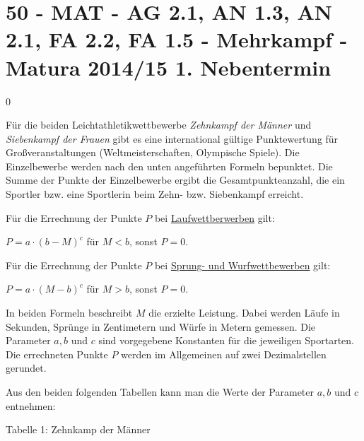 \section{50 - MAT - AG 2.1, AN 1.3, AN 2.1, FA 2.2, FA 1.5 - Mehrkampf - Matura 2014/15 1. Nebentermin}

\begin{langesbeispiel} \item[0] %
				
				Für die beiden Leichtathletikwettbewerbe \textit{Zehnkampf der Männer} und \textit{Siebenkampf der Frauen} gibt es eine international gültige Punktewertung für Großveranstaltungen (Weltmeisterschaften, Olympische Spiele). Die Einzelbewerbe werden nach den unten angeführten Formeln bepunktet. Die Summe der Punkte der Einzelbewerbe ergibt die Gesamtpunkteanzahl, die ein Sportler bzw. eine Sportlerin beim Zehn- bzw. Siebenkampf erreicht.\leer
				
				Für die Errechnung der Punkte $P$ bei \underline{Laufwettberwerben} gilt:
				
				$P=a\cdot (b-M)^c$ für $M<b$, sonst $P=0$.\leer
				
				Für die Errechnung der Punkte $P$ bei \underline{Sprung- und Wurfwettbewerben} gilt:
				
				$P=a\cdot (M-b)^c$ für $M>b$, sonst $P=0$.\leer
				
				In beiden Formeln beschreibt $M$ die erzielte Leistung. Dabei werden Läufe in Sekunden, Sprünge in Zentimetern und Würfe in Metern gemessen. Die Parameter $a, b$ und $c$ sind vorgegebene Konstanten für die jeweiligen Sportarten. Die errechneten Punkte $P$ werden im Allgemeinen auf zwei Dezimalstellen gerundet.

Aus den beiden folgenden Tabellen kann man die Werte der Parameter $a, b$ und $c$ entnehmen:

Tabelle 1: Zehnkamp der Männer


\end{langesbeispiel}
